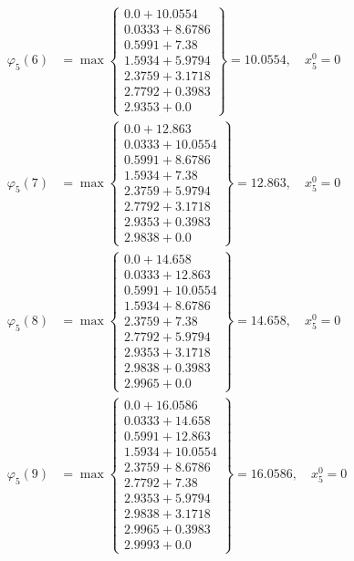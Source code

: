 \documentclass{article}
\begin{document}
\begin{align*}
\varphi_{5}(6) &= \max \left\{ \begin{array}{c}
0.0 + 10.0554 \\
 0.0333 + 8.6786 \\
 0.5991 + 7.38 \\
 1.5934 + 5.9794 \\
 2.3759 + 3.1718 \\
 2.7792 + 0.3983 \\
 2.9353 + 0.0
\end{array} \right\}=10.0554, \quad x_{5}^0=0\\
  
\varphi_{5}(7) &= \max \left\{ \begin{array}{c}
0.0 + 12.863 \\
 0.0333 + 10.0554 \\
 0.5991 + 8.6786 \\
 1.5934 + 7.38 \\
 2.3759 + 5.9794 \\
 2.7792 + 3.1718 \\
 2.9353 + 0.3983 \\
 2.9838 + 0.0
\end{array} \right\}=12.863, \quad x_{5}^0=0\\
  
\varphi_{5}(8) &= \max \left\{ \begin{array}{c}
0.0 + 14.658 \\
 0.0333 + 12.863 \\
 0.5991 + 10.0554 \\
 1.5934 + 8.6786 \\
 2.3759 + 7.38 \\
 2.7792 + 5.9794 \\
 2.9353 + 3.1718 \\
 2.9838 + 0.3983 \\
 2.9965 + 0.0
\end{array} \right\}=14.658, \quad x_{5}^0=0\\
  
\varphi_{5}(9) &= \max \left\{ \begin{array}{c}
0.0 + 16.0586 \\
 0.0333 + 14.658 \\
 0.5991 + 12.863 \\
 1.5934 + 10.0554 \\
 2.3759 + 8.6786 \\
 2.7792 + 7.38 \\
 2.9353 + 5.9794 \\
 2.9838 + 3.1718 \\
 2.9965 + 0.3983 \\
 2.9993 + 0.0
\end{array} \right\}=16.0586, \quad x_{5}^0=0\\
  

\end{align*}
\end{document}
